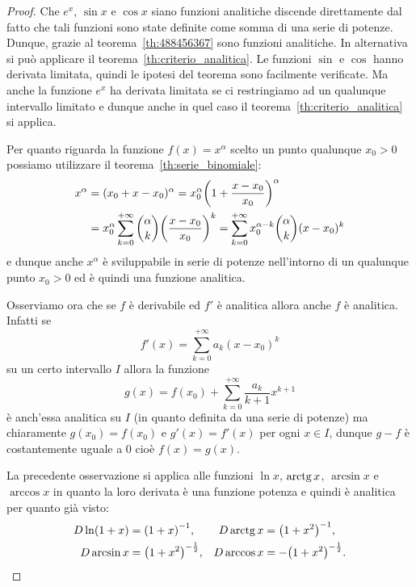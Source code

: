 \begin{proof}
  Che $e^x$, $\sin x$ e $\cos x$ siano funzioni analitiche discende direttamente
  dal fatto che tali funzioni sono state definite come somma di una serie
  di potenze.
  Dunque, grazie al teorema~\ref{th:488456367} sono funzioni
  analitiche.
  In alternativa si può applicare il teorema~\ref{th:criterio_analitica}. Le funzioni
  $\sin$ e $\cos$ hanno derivata limitata, quindi le ipotesi del teorema
  sono facilmente verificate. Ma anche la funzione $e^x$ ha derivata limitata
  se ci restringiamo ad un qualunque intervallo limitato e dunque anche in quel
  caso il teorema~\ref{th:criterio_analitica} si applica.

  Per quanto riguarda la funzione $f(x)=x^\alpha$ scelto un punto qualunque $x_0>0$
  possiamo utilizzare il teorema~\ref{th:serie_binomiale}:
    \begin{align*}
    x^\alpha
    &= (x_0 + x-x_0)^\alpha
    = x_0^\alpha {\left( 1+\frac {x-x_0} {x_0} \right)}^\alpha \\
    &= x_0^\alpha \sum_{k=0}^{+\infty} {\alpha \choose k} {\left( \frac{x-x_0}{x_0} \right)}^k
    = \sum_{k=0}^{+\infty} x_0^{\alpha-k}{\alpha \choose k} (x-x_0)^k
  \end{align*}
  e dunque anche $x^\alpha$ è sviluppabile in serie di potenze
  nell'intorno di un qualunque punto $x_0>0$ ed è quindi una
  funzione analitica.

  Osserviamo ora che se $f$ è derivabile ed $f'$ è analitica
  allora anche
  $f$ è analitica. Infatti se
  \[
    f'(x) = \sum_{k=0}^{+\infty} a_k (x-x_0)^k
  \]
  su un certo intervallo $I$
  allora la funzione
  \begin{equation}\label{eq:4569903}
    g(x) = f(x_0) + \sum_{k=0}^{+\infty} \frac{a_k}{k+1}x^{k+1}
  \end{equation}
  è anch'essa analitica su $I$ (in quanto definita da una serie di potenze)
  ma chiaramente $g(x_0) = f(x_0)$ e $g'(x) = f'(x)$ per ogni $x\in I$,
  dunque $g-f$ è costantemente uguale a $0$ cioè $f(x) = g(x)$.

  La precedente osservazione si applica alle funzioni 
  $\ln x$, $\operatorname{arctg} x$, $\arcsin x$ e $\arccos x$ 
  in quanto la loro derivata è una funzione potenza e quindi
  è analitica per quanto già visto:
  \begin{align*}
    D \ln (1+x) &= {\left( 1+x \right)}^{-1}, &
    D \operatorname{arctg} x &= {\left( 1+x^2 \right)}^{-1}, \\
    D \arcsin x &= {\left( 1+x^2 \right)}^{-\frac 1 2}, &
    D \arccos x &= -{\left( 1+x^2 \right)}^{-\frac 1 2}.
  \end{align*}


\end{proof}
